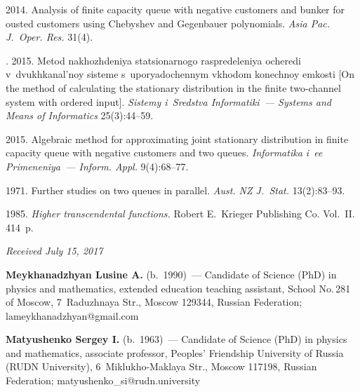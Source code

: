 \begin{multicols}{2}
{{\begin{thebibliography}{99}
 2014. 
Analysis of finite capacity queue with negative customers and bunker for ousted 
customers using Chebyshev and Gegenbauer polynomials. 
\textit{Asia Pac. J.~Oper. Res.} 31(4).

. 2015. 
Metod nakhozhdeniya statsionarnogo raspredeleniya ocheredi v~dvukhkanal'noy sisteme 
s~uporyadochennym vkhodom konechnoy emkosti [On the method of 
calculating the stationary distribution in the finite two-channel system with 
ordered input].
\textit{Sistemy i~Sredstva Informatiki~--- 
Systems and Means of Informatics} 25(3):44--59.

 2015. Algebraic method 
for approximating joint stationary distribution in finite capacity queue 
with negative customers and two queues. 
\textit{Informatika i~ee Primeneniya~--- Inform. Appl.} 9(4):68--77.

 1971. 
Further studies on two queues in parallel. 
\textit{Aust. NZ J.~Stat.} 13(2):83--93.


 1985. 
\textit{Higher transcendental functions.} 
Robert E.\ Krieger Publishing Co.  Vol.~II. 414~p.

\end{thebibliography} } }

\end{multicols}

\vspace*{-6pt}

\hfill{\small\textit{Received July 15, 2017}}



\vspace*{-24pt}

\Contr

\vspace*{-2pt}

\noindent
\textbf{Meykhanadzhyan Lusine A.} (b.\ 1990)~---
Candidate of Science (PhD) in physics and mathematics,
 extended education teaching assistant, School No.\,281 of Moscow, 
7~Raduzhnaya Str., Moscow 129344, Russian Federation; 
\mbox{lameykhanadzhyan@gmail.com}

\vspace*{2pt}


\noindent
\textbf{Matyushenko Sergey I.} (b.\ 1963)~--- 
Candidate of Science (PhD) in physics and 
mathematics, associate professor, Peoples' Friendship University of Russia 
(RUDN University), 6~Miklukho-Maklaya Str., Moscow 117198, Russian Federation; 
\mbox{matyushenko\_si@rudn.university}

